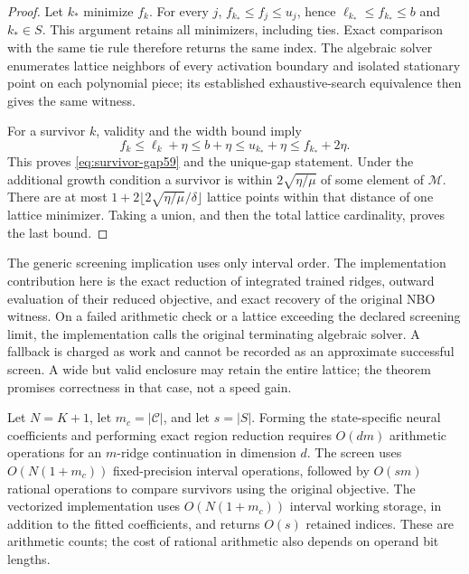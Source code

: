 \begin{proof}
Let $k_*$ minimize $f_k$. For every $j$, $f_{k_*}\leq f_j\leq u_j$, hence $\ell_{k_*}\leq f_{k_*}\leq b$ and $k_*\in S$. This argument retains all minimizers, including ties. Exact comparison with the same tie rule therefore returns the same index. The algebraic solver enumerates lattice neighbors of every activation boundary and isolated stationary point on each polynomial piece; its established exhaustive-search equivalence then gives the same witness.

For a survivor $k$, validity and the width bound imply
\[
 f_k\leq\ell_k+\eta\leq b+\eta
      \leq u_{k_*}+\eta\leq f_{k_*}+2\eta.
\]
This proves \eqref{eq:survivor-gap59} and the unique-gap statement. Under the additional growth condition a survivor is within $2\sqrt{\eta/\mu}$ of some element of $\mathcal M$. There are at most $1+2\lfloor2\sqrt{\eta/\mu}/\delta\rfloor$ lattice points within that distance of one lattice minimizer. Taking a union, and then the total lattice cardinality, proves the last bound.
\end{proof}

The generic screening implication uses only interval order. The implementation contribution here is the exact reduction of integrated trained ridges, outward evaluation of their reduced objective, and exact recovery of the original NBO witness. On a failed arithmetic check or a lattice exceeding the declared screening limit, the implementation calls the original terminating algebraic solver. A fallback is charged as work and cannot be recorded as an approximate successful screen. A wide but valid enclosure may retain the entire lattice; the theorem promises correctness in that case, not a speed gain.

\begin{proposition}\label{prop:screen-work59}
Let $N=K+1$, let $m_c=|\mathcal C|$, and let $s=|S|$. Forming the state-specific neural coefficients and performing exact region reduction requires $O(dm)$ arithmetic operations for an $m$-ridge continuation in dimension $d$. The screen uses $O(N(1+m_c))$ fixed-precision interval operations, followed by $O(sm)$ rational operations to compare survivors using the original objective. The vectorized implementation uses $O(N(1+m_c))$ interval working storage, in addition to the fitted coefficients, and returns $O(s)$ retained indices. These are arithmetic counts; the cost of rational arithmetic also depends on operand bit lengths.
\end{proposition}


